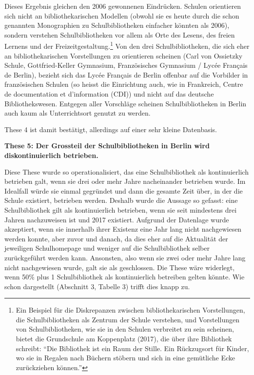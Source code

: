 \documentclass[a4paper,
fontsize=11pt,
oneside,
numbers=noperiodatend,
parskip=half-,
bibliography=totoc,
final
]{scrartcl}
\begin{document}
Dieses Ergebnis gleichen den 2006 gewonnenen Eindrücken. Schulen
orientieren sich nicht an bibliothekarischen Modellen (obwohl sie es
heute durch die schon genannten Monographien zu Schulbibliotheken
einfacher könnten als 2006), sondern verstehen Schulbibliotheken vor
allem als Orte des Lesens, des freien Lernens und der
Freizeitgestaltung.\footnote{Ein Beispiel für die Diskrepanzen zwischen
  bibliothekarischen Vorstellungen, die Schulbibliotheken als Zentrum
  der Schule verstehen, und Vorstellungen von Schulbibliotheken, wie sie
  in den Schulen verbreitet zu sein scheinen, bietet die Grundschule am
  Koppenplatz (2017), die über ihre Bibliothek schreibt: \enquote{Die
  Bibliothek ist ein Raum der Stille. Ein Rückzugsort für Kinder, wo sie
  in Regalen nach Büchern stöbern und sich in eine gemütliche Ecke
  zurückziehen können.}} Von den drei Schulbibliotheken, die sich eher
an bibliothekarischen Vorstellungen zu orientieren scheinen (Carl von
Ossietzky Schule, Gottfried-Keller Gymnasium, Französisches Gymnasium /
Lycée Français de Berlin), bezieht sich das Lycée Français de Berlin
offenbar auf die Vorbilder in französischen Schulen (so heisst die
Einrichtung auch, wie in Frankreich, Centre de documentation et
d'information (CDI)) und nicht auf das deutsche Bibliothekswesen.
Entgegen aller Vorschläge scheinen Schulbibliotheken in Berlin auch kaum
als Unterrichtsort genutzt zu werden.

These 4 ist damit bestätigt, allerdings auf einer sehr kleine
Datenbasis.

\textbf{These 5: Der Grossteil der Schulbibliotheken in Berlin wird
diskontinuierlich betrieben.}

Diese These wurde so operationalisiert, das eine Schulbibliothek als
kontinuierlich betrieben galt, wenn sie drei oder mehr Jahre
nacheinander betrieben wurde. Im Idealfall würde sie einmal gegründet
und dann die gesamte Zeit über, in der die Schule existiert, betrieben
werden. Deshalb wurde die Aussage so gefasst: eine Schulbibliothek gilt
als kontinuierlich betrieben, wenn sie seit mindestens drei Jahren
nachzuweisen ist und 2017 existiert. Aufgrund der Datenlage wurde
akzeptiert, wenn sie innerhalb ihrer Existenz eine Jahr lang nicht
nachgewiesen werden konnte, aber zuvor und danach, da dies eher auf die
Aktualität der jeweiligen Schulhomepage und weniger auf die
Schulbibliothek selber zurückgeführt werden kann. Ansonsten, also wenn
sie zwei oder mehr Jahre lang nicht nachgewiesen wurde, galt sie als
geschlossen. Die These wäre widerlegt, wenn 50\% plus 1 Schulbibliothek
als kontinuierlich betreiben gelten könnte. Wie schon dargestellt
(Abschnitt 3, Tabelle 3) trifft dies knapp zu.
\end{document}

